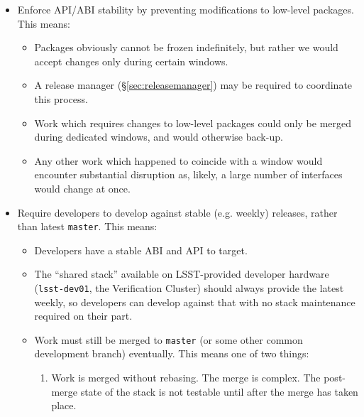 \documentclass[DM,toc]{lsstdoc}
\begin{document}
\begin{itemize}

  \item{Enforce API/ABI stability by preventing modifications to low-level
  packages. This means:

    \begin{itemize}

      \item{Packages obviously cannot be frozen indefinitely, but rather we
      would accept changes only during certain windows.}

      \item{A release manager (\S\ref{sec:releasemanager}) may be required
      to coordinate this process.}

      \item{Work which requires changes to low-level packages could only be
      merged during dedicated windows, and would otherwise back-up.}

      \item{Any other work which happened to coincide with a window would
      encounter substantial disruption as, likely, a large number of
      interfaces would change at once.}

    \end{itemize}

  }

  \item{Require developers to develop against stable (e.g. weekly) releases,
  rather than latest \texttt{master}. This means:

    \begin{itemize}

      \item{Developers have a stable ABI and API to target.}

      \item{The ``shared stack'' available on LSST-provided developer hardware
      (\texttt{lsst-dev01}, the Verification Cluster) should always provide
      the latest weekly, so developers can develop against that with no stack
      maintenance required on their part.}

      \item{Work must still be merged to \texttt{master} (or some other
      common development branch) eventually. This means one of two things:

        \begin{enumerate}

          \item{Work is merged without rebasing. The merge is complex. The
          post-merge state of the stack is not testable until after the merge
          has taken place.}


\end{enumerate}}
\end{itemize}}
\end{itemize}
\end{document}
